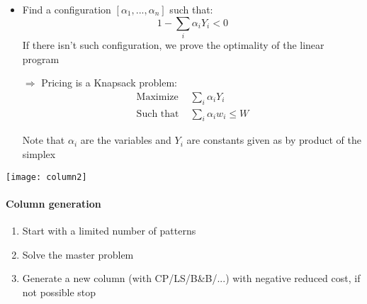 \begin{itemize}
    \item Find a configuration $[\alpha_1, ..., \alpha_n]$ such that:
        $$1 - \sum_i \alpha_i Y_i < 0$$
        If there isn't such configuration, we prove the optimality of the
        linear program

    \item[$\Rightarrow$] Pricing is a Knapsack problem:
        \begin{eqnarray*}
            \textrm{Maximize } & \sum_i \alpha_i Y_i\\
            \textrm{Such that } & \sum_i \alpha_i w_i \leq W
        \end{eqnarray*}

        Note that $\alpha_i$ are the variables and $Y_i$ are constants
        given as by product of the simplex
\end{itemize}

\begin{center}
\texttt{[image: column2]}
\end{center}


\paragraph{Column generation}
\begin{enumerate}
    \item Start with a limited number of patterns
    \item Solve the master problem 
    \item  Generate a new column (with CP/LS/B\&B/...) with negative reduced cost, if
        not possible stop
\end{enumerate}

